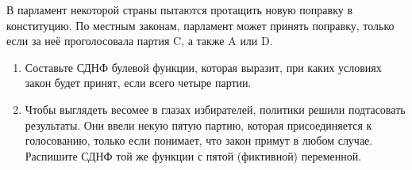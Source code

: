 \question
В парламент некоторой страны пытаются протащить новую поправку в конституцию. По местным законам, парламент может принять поправку, только если за неё проголосовала партия C, а также A или D.

\begin{enumerate}
    \item Составьте СДНФ булевой функции, которая выразит, при каких условиях закон будет принят, если всего четыре партии.
    \item Чтобы выглядеть весомее в глазах избирателей, политики решили подтасовать результаты.  Они ввели некую пятую партию, которая присоединяется к голосованию, только если понимает, что закон примут в любом случае. Распишите СДНФ той же функции с пятой (фиктивной) переменной.
\end{enumerate}